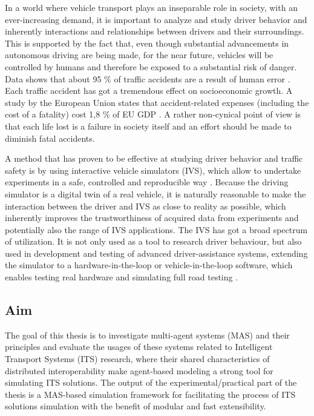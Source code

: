 \documentclass[titlepage, 12pt]{article}
\begin{document}
In a world where vehicle transport plays an inseparable role in society, with an ever-increasing
demand, it is important to analyze and study driver behavior and inherently interactions and
relationships between drivers and their surroundings. This is supported by the fact that, even though
substantial advancements in autonomous driving are being made, for the near future, vehicles 
will be controlled by humans and therefore be exposed to a substantial risk of danger. 
Data shows that about 95 \% of traffic accidents are a result of human error \cite{Parliament2021}. 
Each traffic accident has got a tremendous effect on socioeconomic growth. A study by the European
Union states that accident-related expenses (including the cost of a fatality) cost 1,8 \% of EU GDP \cite{Wijnen2017}.  
A rather non-cynical point of view is that each life lost is a failure in society itself and an effort
should be made to diminish fatal accidents.

A method that has proven to be effective at studying driver behavior and traffic safety is by
using interactive vehicle simulators (IVS), which allow to undertake experiments in a safe,
controlled and reproducible way \cite{Winter2012}.  Because the driving simulator is a digital
twin of a real vehicle, it is naturally reasonable to make the interaction between the driver
and IVS as close to reality as possible, which inherently improves the trustworthiness of
acquired data from experiments and potentially also the range of IVS applications. The IVS has
got a broad spectrum of utilization. It is not only used as a tool to research driver
behaviour, but also used in development and testing of advanced driver-assistance systems,
extending the simulator to a hardware-in-the-loop or vehicle-in-the-loop software, which
enables testing real hardware and simulating full road testing \cite{Horvath2019}.

\subsection{Aim}

The goal of this thesis is to investigate multi-agent systems (MAS) and their principles and
evaluate the usages of these systems related to Intelligent Transport Systems (ITS) research,
where their shared characteristics of distributed interoperability make agent-based modeling a
strong tool for simulating ITS solutions. The output of the experimental/practical part of the
thesis is a MAS-based simulation framework for facilitating the process of ITS solutions
simulation with the benefit of modular and fast extensibility.
\end{document}
